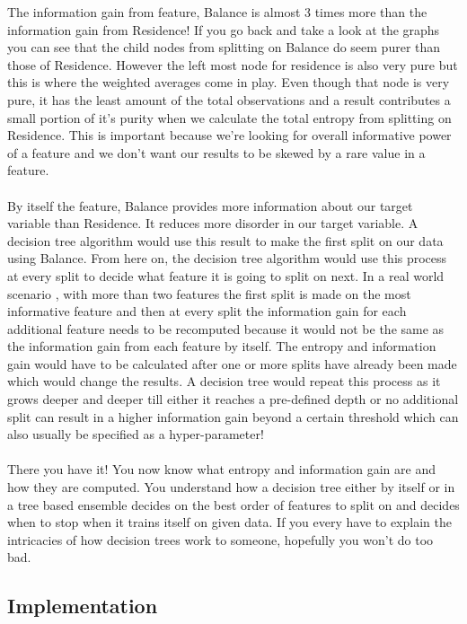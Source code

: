 \documentclass[12pt, A4]{report}
\begin{document}
	The information gain from feature, Balance is almost 3 times more than the information gain from Residence! If you go back and take a look at the graphs you can see that the child nodes from splitting on Balance do seem purer than those of Residence. However the left most node for residence is also very pure but this is where the weighted averages come in play. Even though that node is very pure, it has the least amount of the total observations and a result contributes a small portion of it’s purity when we calculate the total entropy from splitting on Residence. This is important because we’re looking for overall informative power of a feature and we don’t want our results to be skewed by a rare value in a feature.
	\\ \\
	By itself the feature, Balance provides more information about our target variable than Residence. It reduces more disorder in our target variable. A decision tree algorithm would use this result to make the first split on our data using Balance. From here on, the decision tree algorithm would use this process at every split to decide what feature it is going to split on next. In a real world scenario , with more than two features the first split is made on the most informative feature and then at every split the information gain for each additional feature needs to be recomputed because it would not be the same as the information gain from each feature by itself. The entropy and information gain would have to be calculated after one or more splits have already been made which would change the results. A decision tree would repeat this process as it grows deeper and deeper till either it reaches a pre-defined depth or no additional split can result in a higher information gain beyond a certain threshold which can also usually be specified as a hyper-parameter!
	\\ \\
	There you have it! You now know what entropy and information gain are and how they are computed. You understand how a decision tree either by itself or in a tree based ensemble decides on the best order of features to split on and decides when to stop when it trains itself on given data. If you every have to explain the intricacies of how decision trees work to someone, hopefully you won’t do too bad.\\

\subsection*{Implementation}

\end{document}
